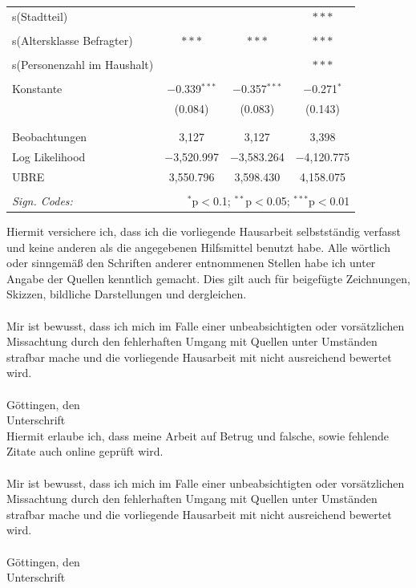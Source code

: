 \documentclass{Vorlage}
\begin{document}
\begin{appendix}
\begin{table}[h]
\begin{tabular}{@{\extracolsep{5pt}}lccc}
 s(Stadtteil) &  &  & $***$ \\ 
  & & & \\ 
 s(Altersklasse Befragter) & $***$ & $***$  & $***$ \\ 
  & & & \\ 
 s(Personenzahl im Haushalt) &  &  & $***$ \\ 
  & & & \\ 
 Konstante & $-$0.339$^{***}$ & $-$0.357$^{***}$ & $-$0.271$^{*}$ \\ 
  & (0.084) & (0.083) & (0.143) \\ 
  & & & \\ 
\hline \\[-1.8ex] 
Beobachtungen & 3,127 & 3,127 & 3,398 \\ 
Log Likelihood & $-$3,520.997 & $-$3,583.264 & $-$4,120.775 \\ 
UBRE & 3,550.796 & 3,598.430 & 4,158.075 \\ 
\hline 
\hline \\[-1.8ex] 
\textit{Sign. Codes:}  & \multicolumn{3}{r}{$^{*}$p$<$0.1; $^{**}$p$<$0.05; $^{***}$p$<$0.01} \\ 
\end{tabular} 
\end{table} 

\end{appendix}
\clearpage
\pagestyle{plain}


Hiermit versichere ich, dass ich die vorliegende Hausarbeit selbstständig verfasst und keine anderen als die angegebenen
Hilfsmittel benutzt habe. Alle wörtlich oder sinngemäß den Schriften anderer entnommenen Stellen
habe ich unter Angabe der Quellen kenntlich gemacht. Dies gilt auch für beigefügte Zeichnungen, Skizzen, bildliche
Darstellungen und dergleichen.\\
\\
Mir ist bewusst, dass ich mich im Falle einer unbeabsichtigten oder vorsätzlichen Missachtung durch den fehlerhaften
Umgang mit Quellen unter Umständen strafbar mache und die vorliegende Hausarbeit mit nicht ausreichend
bewertet wird.
\\
\\Göttingen, den
\\Unterschrift
\vspace*{4cm}
\\
Hiermit erlaube ich, dass meine Arbeit auf Betrug und falsche, sowie fehlende Zitate auch online geprüft wird.\\
\\
Mir ist bewusst, dass ich mich im Falle einer unbeabsichtigten oder vorsätzlichen Missachtung durch den fehlerhaften
Umgang mit Quellen unter Umständen strafbar mache und die vorliegende Hausarbeit mit nicht ausreichend
bewertet wird.
\\
\\Göttingen, den
\\Unterschrift
\clearpage
\end{document}

